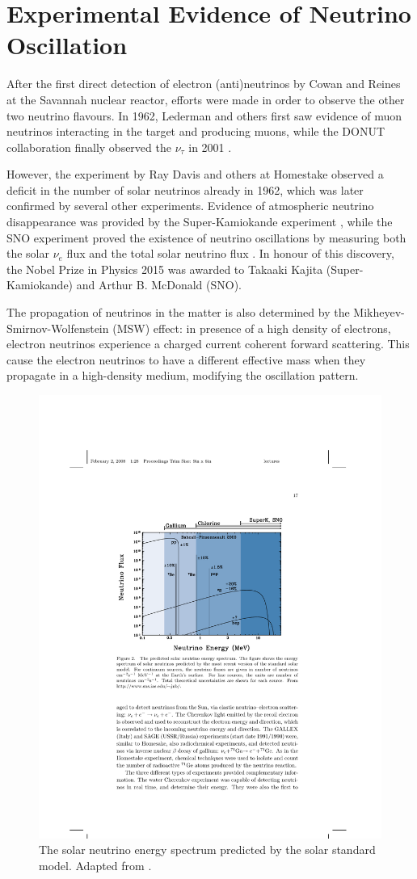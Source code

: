 \section{Experimental Evidence of Neutrino Oscillation}
After the first direct detection of electron (anti)neutrinos by Cowan and Reines at the Savannah nuclear reactor, efforts were made in order to observe the other two neutrino flavours.
In 1962, Lederman and others \cite{PhysRevLett.9.36} first saw evidence of muon neutrinos interacting in the target and producing muons, while the DONUT collaboration finally observed the $\nu_{\tau}$ in 2001 \cite{Kodama:2000mp}.

However, the experiment by Ray Davis and others at Homestake observed a deficit in the number of solar neutrinos already in 1962, which was later confirmed by several other experiments. Evidence of atmospheric neutrino disappearance was provided by the Super-Kamiokande experiment \cite{Fukuda:1998mi}, while the SNO experiment proved the existence of neutrino oscillations by measuring both the solar $\nu_{e}$ flux and the total solar neutrino flux \cite{Ahmad:2002jz}. In honour of this discovery, the Nobel Prize in Physics 2015 was awarded to Takaaki Kajita (Super-Kamiokande) and Arthur B. McDonald (SNO). 

The propagation of neutrinos in the matter is also determined by the Mikheyev-Smirnov-Wolfenstein (MSW) effect: in presence of a high density of electrons, electron neutrinos experience a charged current coherent forward scattering. This cause the electron neutrinos to have a different effective mass when they propagate in a high-density medium, modifying the oscillation pattern. 

\begin{figure}[htbp]
    \centering
    \includegraphics[width=0.75\linewidth]{figures/solar.pdf}
    \caption{The solar neutrino energy spectrum predicted by the solar standard model. Adapted from \cite{Bahcall:2000nu}.}
    \label{fig:solar}
\end{figure}

